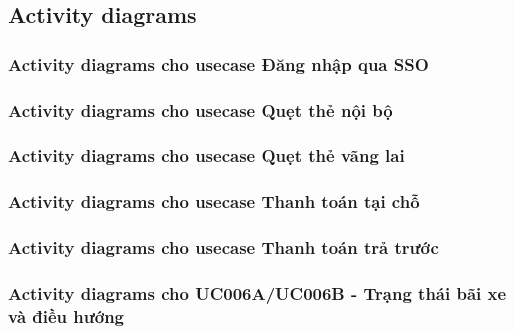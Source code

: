 \newpage
\subsection{\textbf{Activity diagrams}}
\subsubsection{Activity diagrams cho usecase Đăng nhập qua SSO}




\newpage

\subsubsection{Activity diagrams cho usecase Quẹt thẻ nội bộ}



\newpage

\subsubsection{Activity diagrams cho usecase Quẹt thẻ vãng lai }




 

\newpage

\subsubsection{Activity diagrams cho usecase Thanh toán tại chỗ}



\newpage

\subsubsection{Activity diagrams cho usecase Thanh toán trả trước}





\newpage

\subsubsection{Activity diagrams cho UC006A/UC006B - Trạng thái bãi xe và điều hướng}


